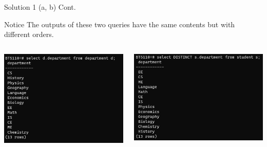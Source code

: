 \begin{frame}[fragile]{Solution 1 (a, b) Cont.}

\begin{alertblock}{Notice}
	The outputs of these two queries have the same contents but with different orders.
\end{alertblock}\vspace{10pt}

	\begin{columns}
		\includegraphics[width=\textwidth]{t2/images/t2-1a.png}
		
		\includegraphics[width=\textwidth]{t2/images/t2-1b.png}
	\end{columns}
	
\end{frame}

